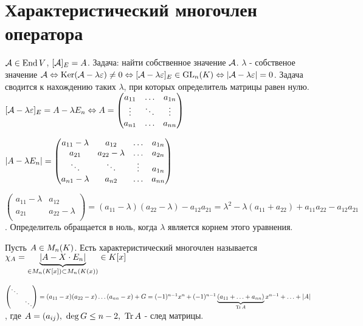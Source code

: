 \documentclass[main]{subfiles}
\begin{document}
\chapter{Характеристический многочлен оператора}

    $\mathcal{A} \in \operatorname{End} V$, $[\mathcal{A}]_E = A$.
    Задача: найти собственное значение $\mathcal{A}$.
    $\lambda$ - собственое значение $\mathcal{A} \Leftrightarrow
    \operatorname{Ker}(\mathcal{A} - \lambda\varepsilon) \neq 0 \Leftrightarrow
    [\mathcal{A} - \lambda\varepsilon]_E \in \operatorname{GL}_n(K) \Leftrightarrow |\mathcal{A} - \lambda\varepsilon| = 0$. Задача сводится к нахождению таких 
    $\lambda$, при которых определитель матрицы равен нулю.
    $[\mathcal{A} - \lambda\varepsilon]_E = A - \lambda E_n \Leftrightarrow
    A = \begin{pmatrix}
        a_{11} & \ldots & a_{1n} \\
        \vdots & \ddots & \vdots  \\
        a_{n1} & \ldots & a_{nn}   \\
    \end{pmatrix}$

    $|A - \lambda E_n| = \begin{pmatrix}
        a_{11} - \lambda & a_{12} & \ldots & a_{1n} \\
        a_{21} &  a_{22} - \lambda & \ldots & a_{2n} \\
        \ddots & \ddots & \vdots & a_{1n} \\
        a_{n1} - \lambda & a_{n2} & \ldots & a_{nn} \\
    \end{pmatrix}$

    $\begin{pmatrix}
        a_{11} - \lambda & a_{12} \\
        a_{21} &  a_{22} - \lambda \\
    \end{pmatrix} = (a_{11} - \lambda)(a_{22} - \lambda) - a_{12} a_{21} = 
    \lambda ^2 - \lambda(a_{11}+a_{22}) + a_{11}a_{22} - a_{12} a_{21}$. Определитель обращается в ноль, когда $\lambda$
    является корнем этого уравнения.

    \begin{definition}
        Пусть $A \in M_n(K)$. Есть характеристический многочлен называется  
        $\chi_A = \underbrace{|A - X\cdot E_n|}_{\in M_n(K[x])\subset M_n(K(x))} \in K[x]$

        $\begin{pmatrix}
            \ddots &  \\
             &  \ddots \\
        \end{pmatrix} = (a_{11} - x)(a_{22} - x)\ldots(a_{nn} - x) + G = 
        (-1)^{n-1}x^n+(-1)^{n-1}\underbrace{(a_{11}+\ldots+a_{nn})}_{\operatorname{Tr}A}x^{n-1}+\ldots+|A|$,
        где $\A= (a_{ij}),\ \deg G \leq n-2,\ \Tr\A$ - след матрицы.
    \end{definition}
\end{document}
